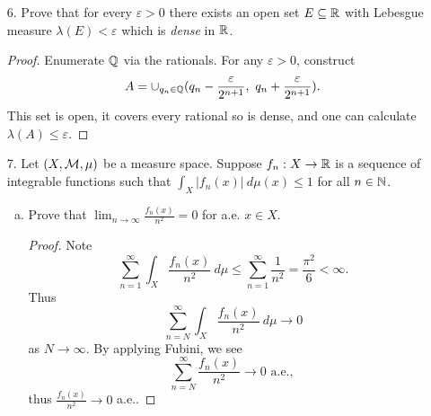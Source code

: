 \begin{itemize}
\begin{enumerate}[(a)]
\item The sequence $\{f_n\}_{n \in \bbn}$ converges in $L^p(\bbr, \calb, \lambda)$ to the constant $0$ function, for every $1 \leq p < \infty$.
\begin{proof}
Not true. 
$$||f_n (x)||_p^p = \int |n \chi_{[1/n, 2/n]}|^p d\lambda = n^p \int \chi_{[1/n, 2/n]} d\lambda = n^{p-1}.$$
\end{proof}

\item The sequence $\{f_n\}_{n \in \bbn}$ converges in measure to the constant $0$ function.
\begin{proof}
True. By Chebyshev's, 
$$\lambda(\{|f_n(x) \geq n|\}) \leq \frac{1}{n}\int |f_n(x)| d\lambda = \frac{1}{n}.$$
\end{proof}
\end{enumerate}





\item[6.] Prove that for every $\varepsilon > 0$ there exists an open set $E \subseteq \mathbb{R}$ with
Lebesgue measure $\lambda(E) < \varepsilon$ which is \textit{dense} in $\mathbb{R}$.
\begin{proof}
Enumerate $\mathbb{Q}$ via the rationals. For any $\varepsilon > 0$, construct 
$$A = \cup_{q_n \in \mathbb{Q}} (q_n - \frac{\varepsilon}{2^{n+1}}, \ q_n + \frac{\varepsilon}{2^{n+1}}).$$
This set is open, it covers every rational so is dense, and one can calculate $\lambda(A) \leq \varepsilon$.
\end{proof}







\item[7.] Let $(X,\mathcal{M}, \mu)$ be a measure space. Suppose $f_n : X \rightarrow \mathbb{R}$ is a sequence
of integrable functions such that $\int_{X} |f_n(x)| \ d\mu(x) \leq 1$ for all $n \in \mathbb{N}$.
\begin{enumerate}[(a)]
\item Prove that $\lim_{n \rightarrow \infty} \frac{f_n(x)}{n^2} = 0$ for a.e. $x \in X$.
\begin{proof}
Note 
$$\sum_{n=1}^{\infty} \int_{X} \frac{f_n(x)}{n^2} \ d\mu \leq \sum_{n=1}^{\infty} \frac{1}{n^2} = \frac{\pi^2}{6} < \infty.$$
Thus $$\sum_{n=N}^{\infty} \int_{X} \frac{f_n(x)}{n^2} \ d\mu \rightarrow 0$$ as $N \rightarrow \infty$. By applying Fubini, we see $$\sum_{n=N}^{\infty} \frac{f_n(x)}{n^2} \rightarrow 0 \text{ a.e., }$$
thus $\frac{f_n(x)}{n^2} \rightarrow 0$ a.e..
\end{proof}


\end{enumerate}
\end{itemize}
